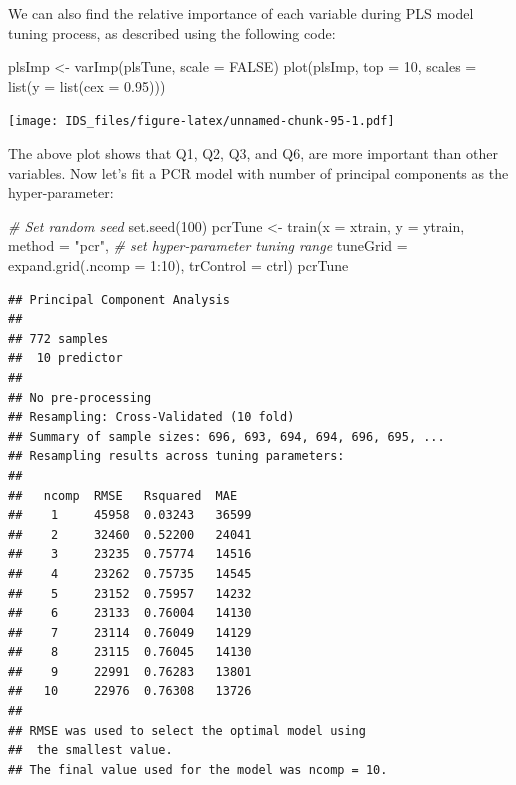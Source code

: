 \documentclass[
  12pt,
]{krantz}
\makeatletter
\newenvironment{Shaded}{\begin{snugshade}}{\end{snugshade}}
\newcommand{\AttributeTok}[1]{\textcolor[rgb]{0.61,0.61,0.61}{#1}}
\newcommand{\CommentTok}[1]{\textcolor[rgb]{0.37,0.37,0.37}{\textit{#1}}}
\newcommand{\ConstantTok}[1]{\textcolor[rgb]{0,0,0}{#1}}
\newcommand{\DecValTok}[1]{\textcolor[rgb]{0.06,0.06,0.06}{#1}}
\newcommand{\FloatTok}[1]{\textcolor[rgb]{0.06,0.06,0.06}{#1}}
\newcommand{\FunctionTok}[1]{\textcolor[rgb]{0,0,0}{#1}}
\newcommand{\NormalTok}[1]{#1}
\newcommand{\OtherTok}[1]{\textcolor[rgb]{0.37,0.37,0.37}{#1}}
\newcommand{\SpecialCharTok}[1]{\textcolor[rgb]{0,0,0}{#1}}
\newcommand{\StringTok}[1]{\textcolor[rgb]{0.5,0.5,0.5}{#1}}
\newenvironment{kframe}{%
\medskip{}
\setlength{\fboxsep}{.8em}
 \def\at@end@of@kframe{}%
 \ifinner\ifhmode%
  \def\at@end@of@kframe{\end{minipage}}%
  \begin{minipage}{\columnwidth}%
 \fi\fi%
 \def\FrameCommand##1{\hskip\@totalleftmargin \hskip-\fboxsep
 \colorbox{shadecolor}{##1}\hskip-\fboxsep
     \hskip-\linewidth \hskip-\@totalleftmargin \hskip\columnwidth}%
 \MakeFramed {\advance\hsize-\width
   \@totalleftmargin\z@ \linewidth\hsize
   \@setminipage}}%
 {\par\unskip\endMakeFramed%
 \at@end@of@kframe}
\renewenvironment{Shaded}{\begin{kframe}}{\end{kframe}}
\makeatother
\begin{document}
We can also find the relative importance of each variable during PLS model tuning process, as described using the following code: 

\begin{Shaded}
\begin{Highlighting}[]
\NormalTok{plsImp }\OtherTok{\textless{}{-}} \FunctionTok{varImp}\NormalTok{(plsTune, }\AttributeTok{scale =} \ConstantTok{FALSE}\NormalTok{)}
\FunctionTok{plot}\NormalTok{(plsImp, }\AttributeTok{top =} \DecValTok{10}\NormalTok{, }\AttributeTok{scales =} \FunctionTok{list}\NormalTok{(}\AttributeTok{y =} \FunctionTok{list}\NormalTok{(}\AttributeTok{cex =} \FloatTok{0.95}\NormalTok{)))}
\end{Highlighting}
\end{Shaded}

\texttt{[image: IDS\_files/figure-latex/unnamed-chunk-95-1.pdf]}

The above plot shows that Q1, Q2, Q3, and Q6, are more important than other variables. Now let's fit a PCR model with number of principal components as the hyper-parameter: 

\begin{Shaded}
\begin{Highlighting}[]
\CommentTok{\# Set random seed}
 \FunctionTok{set.seed}\NormalTok{(}\DecValTok{100}\NormalTok{)}
\NormalTok{ pcrTune }\OtherTok{\textless{}{-}} \FunctionTok{train}\NormalTok{(}\AttributeTok{x =}\NormalTok{ xtrain, }\AttributeTok{y =}\NormalTok{ ytrain,}
          \AttributeTok{method =} \StringTok{"pcr"}\NormalTok{,}
          \CommentTok{\# set hyper{-}parameter tuning range}
          \AttributeTok{tuneGrid =} \FunctionTok{expand.grid}\NormalTok{(}\AttributeTok{.ncomp =} \DecValTok{1}\SpecialCharTok{:}\DecValTok{10}\NormalTok{),}
          \AttributeTok{trControl =}\NormalTok{ ctrl)}
\NormalTok{ pcrTune}
\end{Highlighting}
\end{Shaded}

\begin{verbatim}
## Principal Component Analysis 
## 
## 772 samples
##  10 predictor
## 
## No pre-processing
## Resampling: Cross-Validated (10 fold) 
## Summary of sample sizes: 696, 693, 694, 694, 696, 695, ... 
## Resampling results across tuning parameters:
## 
##   ncomp  RMSE   Rsquared  MAE  
##    1     45958  0.03243   36599
##    2     32460  0.52200   24041
##    3     23235  0.75774   14516
##    4     23262  0.75735   14545
##    5     23152  0.75957   14232
##    6     23133  0.76004   14130
##    7     23114  0.76049   14129
##    8     23115  0.76045   14130
##    9     22991  0.76283   13801
##   10     22976  0.76308   13726
## 
## RMSE was used to select the optimal model using
##  the smallest value.
## The final value used for the model was ncomp = 10.
\end{verbatim}
\end{document}
